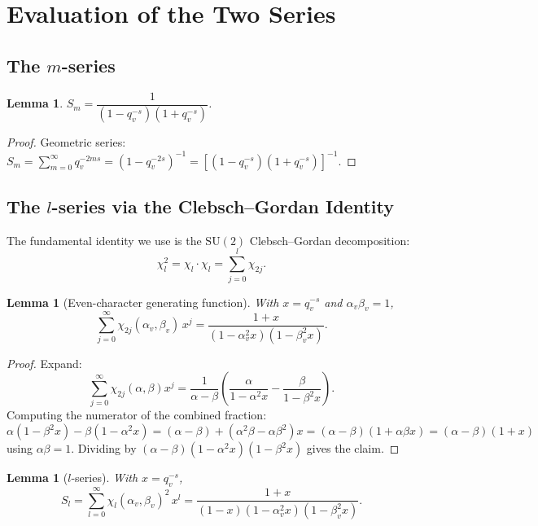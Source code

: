 \documentclass[12pt]{article}
\newtheorem{lemma}[theorem]{Lemma}
\begin{document}
\section{Evaluation of the Two Series}

\subsection{The $m$-series}

\begin{lemma}\label{lem:m-series}
$S_m = \dfrac{1}{(1-q_v^{-s})(1+q_v^{-s})}$.
\end{lemma}

\begin{proof}
Geometric series: $S_m = \sum_{m=0}^\infty q_v^{-2ms} = (1 - q_v^{-2s})^{-1}
= [(1-q_v^{-s})(1+q_v^{-s})]^{-1}$.
\end{proof}

\subsection{The $l$-series via the Clebsch--Gordan Identity}

The fundamental identity we use is the $\mathrm{SU}(2)$ Clebsch--Gordan decomposition:
\begin{equation}\label{eq:CG}
  \chi_l^2 = \chi_l \cdot \chi_l = \sum_{j=0}^l \chi_{2j}.
\end{equation}

\begin{lemma}[Even-character generating function]\label{lem:even-gen}
With $x = q_v^{-s}$ and $\alpha_v \beta_v = 1$,
\[
  \sum_{j=0}^\infty \chi_{2j}(\alpha_v, \beta_v)\, x^j
  = \frac{1+x}{(1-\alpha_v^2 x)(1-\beta_v^2 x)}.
\]
\end{lemma}

\begin{proof}
Expand:
\[
  \sum_{j=0}^\infty \chi_{2j}(\alpha,\beta) x^j
  = \frac{1}{\alpha-\beta}\left(
      \frac{\alpha}{1-\alpha^2 x} - \frac{\beta}{1-\beta^2 x}\right).
\]
Computing the numerator of the combined fraction:
\[
  \alpha(1-\beta^2 x) - \beta(1-\alpha^2 x)
  = (\alpha-\beta) + (\alpha^2 \beta - \alpha \beta^2) x
  = (\alpha-\beta)(1 + \alpha\beta x)
  = (\alpha-\beta)(1+x)
\]
using $\alpha\beta = 1$.  Dividing by $(\alpha-\beta)(1-\alpha^2 x)(1-\beta^2 x)$
gives the claim.
\end{proof}

\begin{lemma}[$l$-series]\label{lem:l-series}
With $x = q_v^{-s}$,
\[
  S_l = \sum_{l=0}^\infty \chi_l(\alpha_v,\beta_v)^2\, x^l
  = \frac{1+x}{(1-x)(1-\alpha_v^2 x)(1-\beta_v^2 x)}.
\]
\end{lemma}
\end{document}
